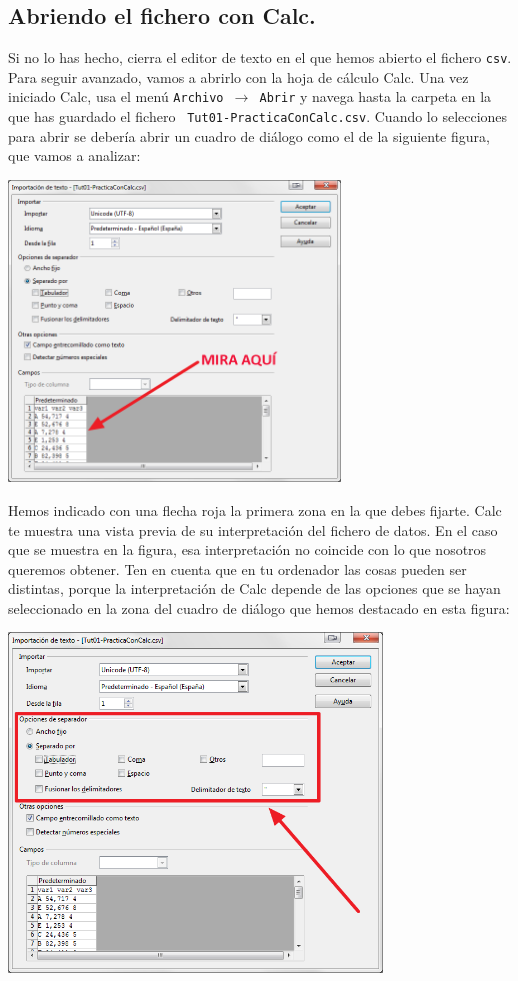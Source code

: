 \documentclass[10pt,a4paper]{article}\usepackage[]{graphicx}\usepackage[]{color}
\begin{document}
\subsection{Abriendo el fichero con Calc.}

Si no lo has hecho, cierra el editor de texto en el que hemos abierto el fichero {\tt csv}. Para
seguir avanzado, vamos a abrirlo con la hoja de cálculo Calc. Una vez iniciado Calc, usa el menú
{\tt Archivo $\to$ Abrir} y navega hasta la carpeta en la que has guardado el fichero {\tt
Tut01-PracticaConCalc.csv}. Cuando lo selecciones para abrir se debería abrir un cuadro de diálogo
como el de la siguiente figura, que vamos a analizar:
        \begin{center}
        \includegraphics[height=8cm]{../fig/Tut00-Calc-csv-01.png}
        \end{center}
Hemos indicado con una flecha roja la primera zona en la que debes fijarte. Calc te muestra una
vista previa de su interpretación del fichero de datos. En el caso que se muestra en la figura, esa
interpretación no coincide con lo que nosotros queremos obtener. Ten en cuenta que en tu ordenador
las cosas pueden ser distintas, porque la interpretación de Calc depende de las opciones que se
hayan seleccionado en la zona del cuadro de diálogo que hemos destacado en esta figura:
        \begin{center}
        \includegraphics[height=9cm]{../fig/Tut00-Calc-csv-02.png}
        \end{center}
\end{document}
